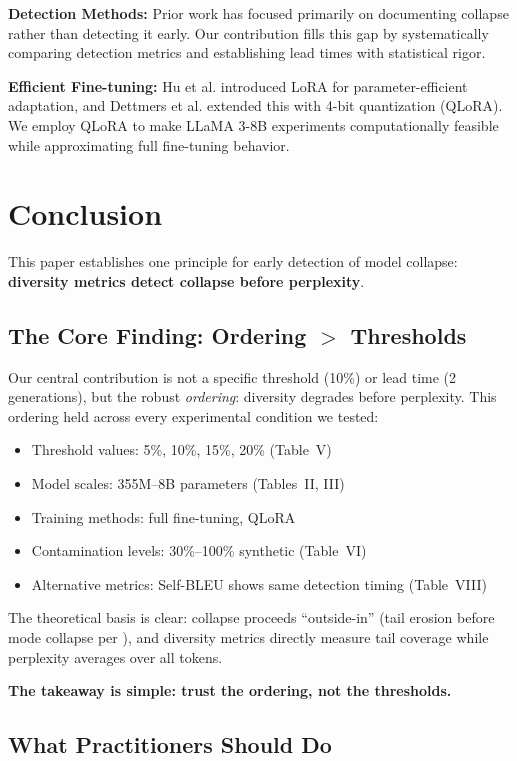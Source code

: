 \documentclass[conference]{IEEEtran}
\begin{document}
\textbf{Detection Methods:} Prior work has focused primarily on documenting collapse rather than detecting it early. Our contribution fills this gap by systematically comparing detection metrics and establishing lead times with statistical rigor.

\textbf{Efficient Fine-tuning:} Hu et al. introduced LoRA for parameter-efficient adaptation, and Dettmers et al. \cite{dettmers2023qlora} extended this with 4-bit quantization (QLoRA). We employ QLoRA to make LLaMA 3-8B experiments computationally feasible while approximating full fine-tuning behavior.

\section{Conclusion}

This paper establishes one principle for early detection of model collapse: \textbf{diversity metrics detect collapse before perplexity}.

\subsection{The Core Finding: Ordering $>$ Thresholds}

Our central contribution is not a specific threshold (10\%) or lead time (2 generations), but the robust \textit{ordering}: diversity degrades before perplexity. This ordering held across every experimental condition we tested:
\begin{itemize}
    \item Threshold values: 5\%, 10\%, 15\%, 20\% (Table~V)
    \item Model scales: 355M--8B parameters (Tables~II, III)
    \item Training methods: full fine-tuning, QLoRA
    \item Contamination levels: 30\%--100\% synthetic (Table~VI)
    \item Alternative metrics: Self-BLEU shows same detection timing (Table~VIII)
\end{itemize}

The theoretical basis is clear: collapse proceeds ``outside-in'' (tail erosion before mode collapse per \cite{dohmatob2025strong}), and diversity metrics directly measure tail coverage while perplexity averages over all tokens.

\textbf{The takeaway is simple: trust the ordering, not the thresholds.}

\subsection{What Practitioners Should Do}
\end{document}
